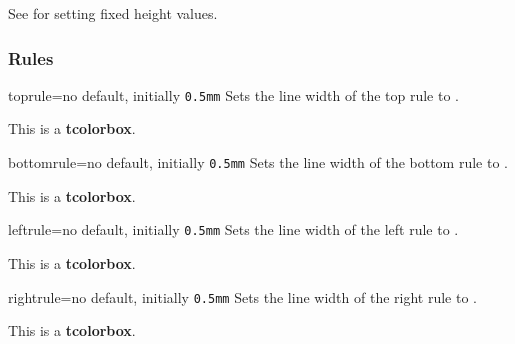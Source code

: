 See  for setting fixed height values.


\clearpage
\subsubsection{Rules}
\begin{docTcbKey}{toprule}{=}{no default, initially \texttt{0.5mm}}
  Sets the line width of the top rule to .
\begin{dispExample}

\begin{tcolorbox}[toprule=3mm]
This is a \textbf{tcolorbox}.
\end{tcolorbox}
\end{dispExample}
\end{docTcbKey}


\begin{docTcbKey}{bottomrule}{=}{no default, initially \texttt{0.5mm}}
  Sets the line width of the bottom rule to .
\begin{dispExample}

\begin{tcolorbox}[bottomrule=3mm]
This is a \textbf{tcolorbox}.
\end{tcolorbox}
\end{dispExample}
\end{docTcbKey}

\begin{docTcbKey}{leftrule}{=}{no default, initially \texttt{0.5mm}}
  Sets the line width of the left rule to .
\begin{dispExample}

\begin{tcolorbox}[leftrule=3mm]
This is a \textbf{tcolorbox}.
\end{tcolorbox}
\end{dispExample}
\end{docTcbKey}


\begin{docTcbKey}{rightrule}{=}{no default, initially \texttt{0.5mm}}
  Sets the line width of the right rule to .
\begin{dispExample}

\begin{tcolorbox}[rightrule=3mm]
This is a \textbf{tcolorbox}.
\end{tcolorbox}
\end{dispExample}
\end{docTcbKey}


